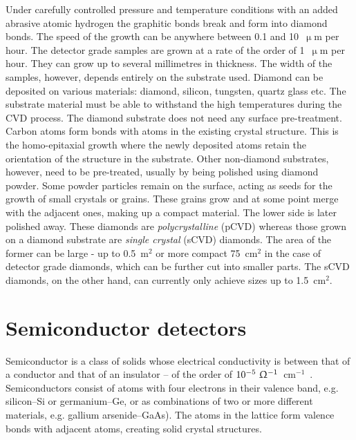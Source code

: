 \begin{description}
Under carefully controlled pressure and temperature conditions with an added abrasive atomic hydrogen the graphitic bonds break and form into diamond bonds. The speed of the growth can be anywhere between 0.1 and 10~$\upmu$m per hour. The detector grade samples are grown at a rate of the order of 1~$\upmu$m per hour. They can grow up to several millimetres in thickness. The width of the samples, however, depends entirely on the substrate used. Diamond can be deposited on various materials: diamond, silicon, tungsten, quartz glass etc. The substrate material must be able to withstand the high temperatures during the CVD process. The diamond substrate does not need any surface pre-treatment. Carbon atoms form bonds with atoms in the existing crystal structure. This is the homo-epitaxial growth where the newly deposited atoms retain the orientation of the structure in the substrate. Other non-diamond substrates, however, need to be pre-treated, usually by being polished using diamond powder. Some powder particles remain on the surface, acting as seeds for the growth of small crystals or grains. These grains grow and at some point merge with the adjacent ones, making up a compact material. The lower side is later polished away. These diamonds are \emph{polycrystalline} (pCVD) whereas those grown on a diamond substrate are \emph{single crystal} (sCVD) diamonds. The area of the former can be large - up to 0.5~m$^2$ or more compact 75~cm$^2$ in the case of detector grade diamonds, which can be further cut into smaller parts. The sCVD diamonds, on the other hand, can currently only achieve sizes up to 1.5~cm$^2$.
\end{description}




\section{Semiconductor detectors}
Semiconductor is a class of solids whose electrical conductivity is between that of a conductor and that of an insulator -- of the order of  $10^{-5}~\Upomega^{-1}$~cm$^{-1}$~\cite{PHSEM:00000}. Semiconductors consist of atoms with four electrons in their valence band, e.g. silicon--Si or germanium--Ge, or as combinations of two or more different materials, e.g. gallium arsenide--GaAs). The atoms in the lattice form valence bonds with adjacent atoms, creating solid crystal structures.

